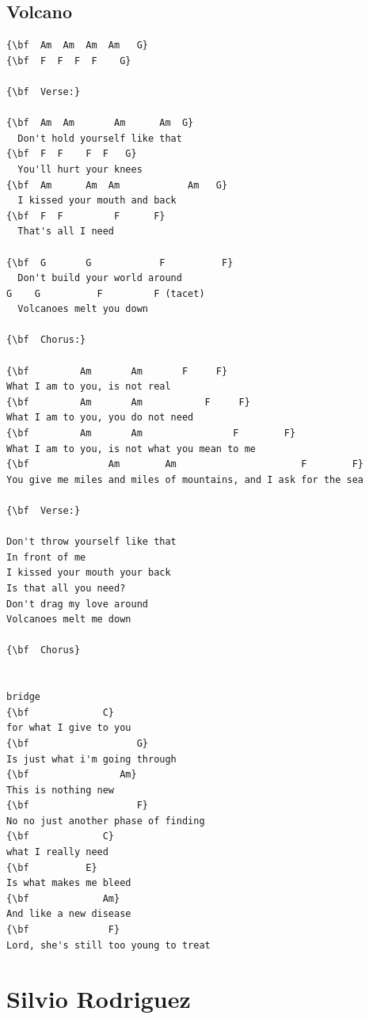 \documentclass[a4paper]{article}
\begin{document}
\subsection{Volcano}
\begin{Verbatim}[commandchars=\\\{\}]
{\bf  Am  Am  Am  Am   G}
{\bf  F  F  F  F    G}

{\bf  Verse:}

{\bf  Am  Am       Am      Am  G}
  Don't hold yourself like that
{\bf  F  F    F  F   G}
  You'll hurt your knees
{\bf  Am      Am  Am            Am   G}
  I kissed your mouth and back
{\bf  F  F         F      F}
  That's all I need

{\bf  G       G            F          F}
  Don't build your world around
G    G          F         F (tacet)
  Volcanoes melt you down

{\bf  Chorus:}

{\bf         Am       Am       F     F}
What I am to you, is not real
{\bf         Am       Am           F     F}
What I am to you, you do not need
{\bf         Am       Am                F        F}
What I am to you, is not what you mean to me
{\bf              Am        Am                      F        F}
You give me miles and miles of mountains, and I ask for the sea

{\bf  Verse:}

Don't throw yourself like that
In front of me
I kissed your mouth your back
Is that all you need?
Don't drag my love around
Volcanoes melt me down

{\bf  Chorus}


bridge
{\bf             C}
for what I give to you
{\bf                   G}
Is just what i'm going through
{\bf                Am}
This is nothing new
{\bf                   F}
No no just another phase of finding
{\bf             C}
what I really need
{\bf          E}
Is what makes me bleed
{\bf             Am}
And like a new disease
{\bf              F}
Lord, she's still too young to treat

\end{Verbatim}
\newpage
\section{Silvio Rodriguez}
\end{document}
